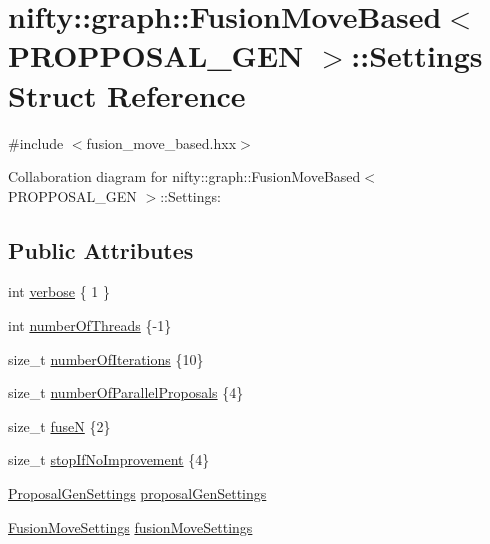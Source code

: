 \hypertarget{structnifty_1_1graph_1_1FusionMoveBased_1_1Settings}{}\section{nifty\+:\+:graph\+:\+:Fusion\+Move\+Based$<$ P\+R\+O\+P\+P\+O\+S\+A\+L\+\_\+\+G\+E\+N $>$\+:\+:Settings Struct Reference}
\label{structnifty_1_1graph_1_1FusionMoveBased_1_1Settings}


{\ttfamily \#include $<$fusion\+\_\+move\+\_\+based.\+hxx$>$}



Collaboration diagram for nifty\+:\+:graph\+:\+:Fusion\+Move\+Based$<$ P\+R\+O\+P\+P\+O\+S\+A\+L\+\_\+\+G\+E\+N $>$\+:\+:Settings\+:
\subsection*{Public Attributes}
\begin{DoxyCompactItemize}
\item 
int \hyperlink{structnifty_1_1graph_1_1FusionMoveBased_1_1Settings_a8b75aaaaf9cad68d1f2ae6de7d3e7979}{verbose} \{ 1 \}
\item 
int \hyperlink{structnifty_1_1graph_1_1FusionMoveBased_1_1Settings_a7a3aff8de420511fe0ff6aaded7e9375}{number\+Of\+Threads} \{-\/1\}
\item 
size\+\_\+t \hyperlink{structnifty_1_1graph_1_1FusionMoveBased_1_1Settings_a10504df44ccf19a16f031ffab03656b0}{number\+Of\+Iterations} \{10\}
\item 
size\+\_\+t \hyperlink{structnifty_1_1graph_1_1FusionMoveBased_1_1Settings_a6febf85f955db5617fbc56fc9c6ec80a}{number\+Of\+Parallel\+Proposals} \{4\}
\item 
size\+\_\+t \hyperlink{structnifty_1_1graph_1_1FusionMoveBased_1_1Settings_a0c1e08727d7d926eccbbb7b6ff2f6a8e}{fuse\+N} \{2\}
\item 
size\+\_\+t \hyperlink{structnifty_1_1graph_1_1FusionMoveBased_1_1Settings_adc2ee0aae71d78b553c123825535857d}{stop\+If\+No\+Improvement} \{4\}
\item 
\hyperlink{classnifty_1_1graph_1_1FusionMoveBased_a397dcfd324df13f658f64519d1072685}{Proposal\+Gen\+Settings} \hyperlink{structnifty_1_1graph_1_1FusionMoveBased_1_1Settings_a4700ff94094b7bd4a7c6c8b9788771d3}{proposal\+Gen\+Settings}
\item 
\hyperlink{classnifty_1_1graph_1_1FusionMoveBased_aae91340fac92d40d69ab7526dd2b12ca}{Fusion\+Move\+Settings} \hyperlink{structnifty_1_1graph_1_1FusionMoveBased_1_1Settings_a25628affe8a883b087bebcf9bf70ba6d}{fusion\+Move\+Settings}
\end{DoxyCompactItemize}


